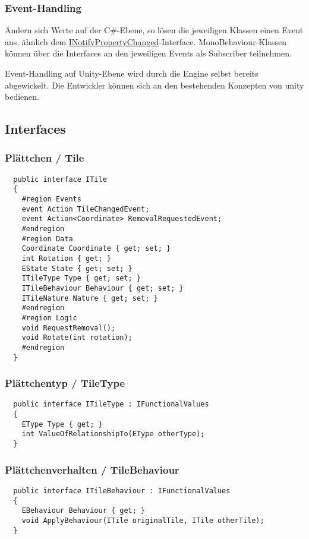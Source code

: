 \documentclass[../main.tex]{subfiles}
\begin{document}
	\subsubsection{Event-Handling}
	\par Ändern sich Werte auf der C\#-Ebene, so lösen die jeweiligen Klassen einen Event aus, ähnlich dem \href{https://docs.microsoft.com/en-us/dotnet/api/system.componentmodel.inotifypropertychanged?view=net-5.0}{INotifyPropertyChanged}-Interface. MonoBehaviour-Klassen können über die Interfaces an den jeweiligen Events als Subscriber teilnehmen.
	\par Event-Handling auf Unity-Ebene wird durch die Engine selbst bereits abgewickelt. Die Entwickler können sich an den bestehenden Konzepten von \gls{unity} bedienen.
	
	\subsection{Interfaces}
	\subsubsection{Plättchen / Tile}
	\begin{lstlisting}
  public interface ITile
  {
	#region Events
	event Action TileChangedEvent;
	event Action<Coordinate> RemovalRequestedEvent;
	#endregion
	#region Data
	Coordinate Coordinate { get; set; }
	int Rotation { get; }
	EState State { get; set; }
	ITileType Type { get; set; }
	ITileBehaviour Behaviour { get; set; }
	ITileNature Nature { get; set; }
	#endregion
	#region Logic
	void RequestRemoval();
	void Rotate(int rotation);
	#endregion
  }
	\end{lstlisting}

	\subsubsection{Plättchentyp / TileType}
	\begin{lstlisting}
  public interface ITileType : IFunctionalValues
  {
	EType Type { get; }
	int ValueOfRelationshipTo(EType otherType);
  }
	\end{lstlisting}

	\subsubsection{Plättchenverhalten / TileBehaviour}
	\begin{lstlisting}
  public interface ITileBehaviour : IFunctionalValues
  {
	EBehaviour Behaviour { get; }
	void ApplyBehaviour(ITile originalTile, ITile otherTile);
  }
	\end{lstlisting}
\end{document}
